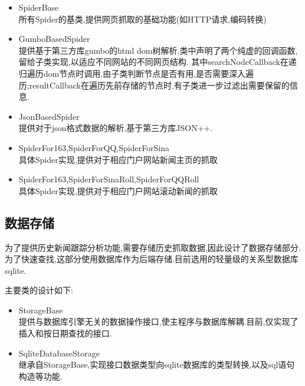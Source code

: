 \documentclass[12pt]{article}
\begin{document}
\begin{itemize}
\item SpiderBase\\
所有Spider的基类,提供网页抓取的基础功能(如HTTP请求,编码转换)

\item GumboBasedSpider\\
提供基于第三方库gumbo的html dom树解析,类中声明了两个纯虚的回调函数,留给子类实现,以适应不同网站的不同网页结构.
其中searchNodeCallback在递归遍历dom节点时调用,由子类判断节点是否有用,是否需要深入遍历;resultCallback在遍历先前存储的节点时,有子类进一步过滤出需要保留的信息.

\item JsonBasedSpider\\
提供对于json格式数据的解析,基于第三方库JSON++.

\item SpiderFor163,SpiderForQQ,SpiderForSina\\
具体Spider实现,提供对于相应门户网站新闻主页的抓取

\item SpiderFor163,SpiderForSinaRoll,SpiderForQQRoll\\
具体Spider实现,提供对于相应门户网站滚动新闻的抓取

\end{itemize}

\subsection{数据存储}

为了提供历史新闻跟踪分析功能,需要存储历史抓取数据,因此设计了数据存储部分.为了快速查找,这部分使用数据库作为后端存储.目前选用的轻量级的关系型数据库sqlite.

主要类的设计如下:

\begin{itemize}
\item StorageBase\\
提供与数据库引擎无关的数据操作接口,使主程序与数据库解耦.目前,仅实现了插入和按日期查找的接口.

\item SqliteDatabaseStorage\\
继承自StorageBase,实现接口数据类型向sqlite数据库的类型转换,以及sql语句构造等功能.
\end{itemize}

\end{document}

